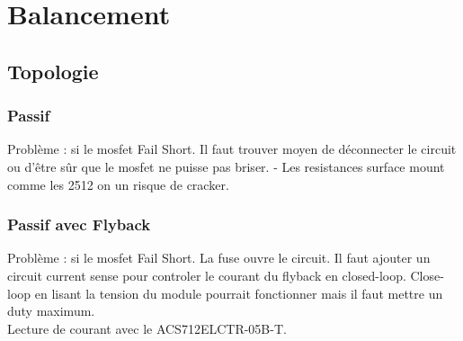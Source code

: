 

\section{Balancement}
	\subsection{Topologie}
	\subsubsection{Passif}
	Probl\`{e}me : si le mosfet Fail Short. Il faut trouver moyen de d\'{e}connecter le circuit ou d'\^{e}tre s\^{u}r que le mosfet ne puisse pas briser.
	- Les resistances surface mount comme les 2512 on un risque de cracker.
	\subsubsection{Passif avec Flyback}
	Probl\`{e}me : si le mosfet Fail Short. La fuse ouvre le circuit. Il faut ajouter un circuit current sense pour controler le courant du flyback en closed-loop. Close-loop en lisant la tension du module pourrait fonctionner mais il faut mettre un duty maximum. 
	\\Lecture de courant avec le ACS712ELCTR-05B-T. 